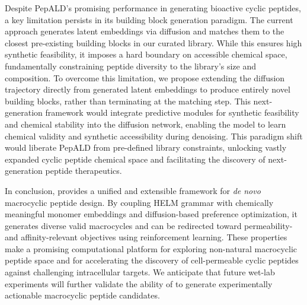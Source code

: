 Despite PepALD's promising performance in generating bioactive cyclic peptides, a key limitation persists in its building block generation paradigm. The current approach generates latent embeddings via diffusion and matches them to the closest pre-existing building blocks in our curated library. While this ensures high synthetic feasibility, it imposes a hard boundary on accessible chemical space, fundamentally constraining peptide diversity to the library's size and composition. To overcome this limitation, we propose extending the diffusion trajectory directly from generated latent embeddings to produce entirely novel building blocks, rather than terminating at the matching step. This next-generation framework would integrate predictive modules for synthetic feasibility and chemical stability into the diffusion network, enabling the model to learn chemical validity and synthetic accessibility during denoising. This paradigm shift would liberate PepALD from pre-defined library constraints, unlocking vastly expanded cyclic peptide chemical space and facilitating the discovery of next-generation peptide therapeutics.

In conclusion, \mytool provides a unified and extensible framework for \textit{de novo} macrocyclic peptide design. By coupling HELM grammar with chemically meaningful monomer embeddings and diffusion-based preference optimization, it generates diverse valid macrocycles and can be redirected toward permeability- and affinity-relevant objectives using reinforcement learning. These properties make \mytool a promising computational platform for exploring non-natural macrocyclic peptide space and for accelerating the discovery of cell-permeable cyclic peptides against challenging intracellular targets. We anticipate that future wet-lab experiments will further validate the ability of \mytool to generate experimentally actionable macrocyclic peptide candidates.
